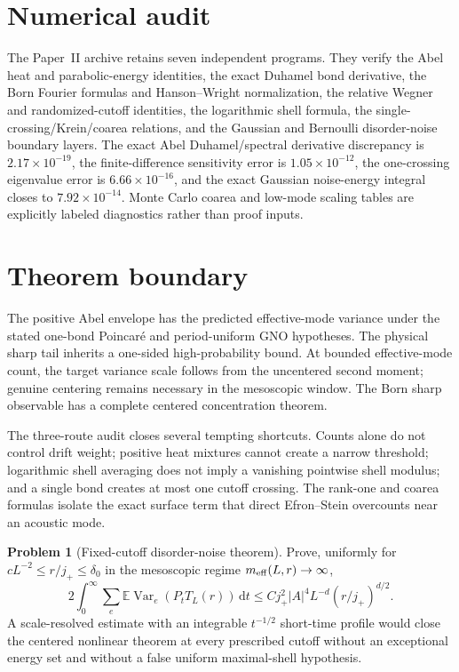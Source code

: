 \documentclass[11pt]{article}
\theoremstyle{definition}
\newtheorem{problem}[theorem]{Problem}
\theoremstyle{remark}
\newcommand{\E}{\mathbb E}
\newcommand{\Var}{\operatorname{Var}}
\newcommand{\abs}[1]{\left\lvert #1\right\rvert}
\newcommand{\dd}{\,\mathrm d}
\begin{document}
\section{Numerical audit}
\label{sec:numerics}

The Paper~II archive retains seven independent programs.  They verify the Abel heat and parabolic-energy identities, the exact Duhamel bond derivative, the Born Fourier formulas and Hanson--Wright normalization, the relative Wegner and randomized-cutoff identities, the logarithmic shell formula, the single-crossing/Krein/coarea relations, and the Gaussian and Bernoulli disorder-noise boundary layers.  The exact Abel Duhamel/spectral derivative discrepancy is $2.17\times10^{-19}$, the finite-difference sensitivity error is $1.05\times10^{-12}$, the one-crossing eigenvalue error is $6.66\times10^{-16}$, and the exact Gaussian noise-energy integral closes to $7.92\times10^{-14}$.  Monte Carlo coarea and low-mode scaling tables are explicitly labeled diagnostics rather than proof inputs.

\section{Theorem boundary}
\label{sec:boundary}

The positive Abel envelope has the predicted effective-mode variance under the stated one-bond Poincar\'e and period-uniform GNO hypotheses.  The physical sharp tail inherits a one-sided high-probability bound.  At bounded effective-mode count, the target variance scale follows from the uncentered second moment; genuine centering remains necessary in the mesoscopic window.  The Born sharp observable has a complete centered concentration theorem.

The three-route audit closes several tempting shortcuts.  Counts alone do not control drift weight; positive heat mixtures cannot create a narrow threshold; logarithmic shell averaging does not imply a vanishing pointwise shell modulus; and a single bond creates at most one cutoff crossing.  The rank-one and coarea formulas isolate the exact surface term that direct Efron--Stein overcounts near an acoustic mode.

\begin{problem}[Fixed-cutoff disorder-noise theorem]
\label{prob:fixed-cutoff-noise}
Prove, uniformly for $cL^{-2}\le r/j_+\le\delta_0$ in the mesoscopic regime $m_{\rm eff}(L,r)\to\infty$,
\[
 2\int_0^\infty\sum_e\E\Var_e(P_tT_L(r))\dd t
 \le Cj_+^2\abs A^4L^{-d}(r/j_+)^{d/2}.
\]
A scale-resolved estimate with an integrable $t^{-1/2}$ short-time profile would close the centered nonlinear theorem at every prescribed cutoff without an exceptional energy set and without a false uniform maximal-shell hypothesis.
\end{problem}
\end{document}
